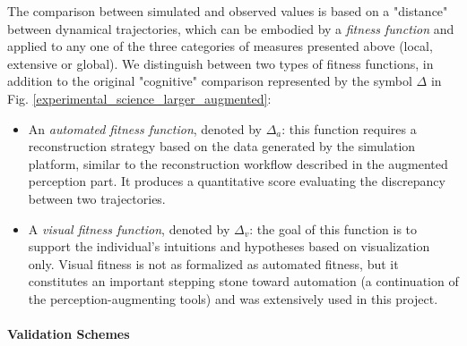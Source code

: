 The comparison between simulated and observed values is based on a "distance" between dynamical trajectories, which can be embodied by a \textit{fitness function} and applied to any one of the three categories of measures presented above (local, extensive or global). We distinguish between two types of fitness functions, in addition to the original "cognitive" comparison represented by the symbol $\Delta$ in Fig. \ref{experimental_science_larger_augmented}:
\begin{itemize}
	\item An \textit{automated fitness function}, denoted by $\Delta_a$: this function requires a reconstruction strategy based on the data generated by the simulation platform, similar to the reconstruction workflow described in the augmented perception part. It produces a quantitative score evaluating the discrepancy between two trajectories.
	\item A \textit{visual fitness function}, denoted by $\Delta_v$: the goal of this function is to support the individual's intuitions and hypotheses based on visualization only. Visual fitness is not as formalized as automated fitness, but it constitutes an important stepping stone toward automation (a continuation of the perception-augmenting tools) and was extensively used in this project.
\end{itemize}

\paragraph{Validation Schemes}



